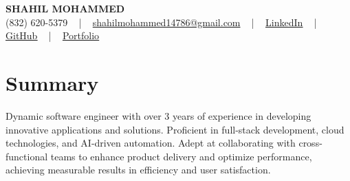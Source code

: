 \documentclass[letterpaper,10pt]{article}
\begin{document}
\begin{center}
    {\fontsize{14pt}{12pt}\selectfont \textbf{\MakeUppercase{Shahil Mohammed}}}\\ \vspace{2pt}
    \fontsize{10pt}{12pt}\selectfont (832) 620-5379 ~ | ~ \href{mailto:shahilmohammed14786@gmail.com}{shahilmohammed14786@gmail.com} ~ | ~  
    \href{https://www.linkedin.com/in/shahil-mohammed-9652931a1/}{\color{blue}\underline{LinkedIn}}  ~ | ~ 
    \href{https://github.com/freakbeast14}{\color{blue}\underline{GitHub}} ~ | ~ 
    \href{https://shahil-mohammed.netlify.app/}{\color{blue}\underline{Portfolio}}
    \vspace{-8pt}
\end{center}

\section{Summary}
\vspace{-2pt}\fontsize{8pt}{9pt}\selectfont
Dynamic software engineer with over 3 years of experience in developing innovative applications and solutions. Proficient in full-stack development, cloud technologies, and AI-driven automation. Adept at collaborating with cross-functional teams to enhance product delivery and optimize performance, achieving measurable results in efficiency and user satisfaction.
 \vspace{-5pt}
 
\vspace{-2pt}
\end{document}
